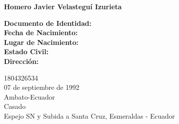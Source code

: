 
\centering\Large\textbf{Homero Javier Velasteguí Izurieta}\\[50pt]

\setlength{\columnsep}{0.75cm}
\setlength{\columnseprule}{0pt}



\begin{paracol}{2}
\begin{leftcolumn}


\begin{minipage}[c][40mm][c]{0.47\textwidth}

\textbf{Documento de Identidad:\\[15pt]
Fecha de Nacimiento:\\[15pt]
Lugar de Nacimiento:\\[15pt]
Estado Civil:\\[15pt]
Dirección:\\}

\end{minipage}




\end{leftcolumn}

\begin{rightcolumn}
\begin{minipage}[c][40mm][c]{0.47\textwidth}
1804326534\\[15pt]
07 de septiembre de 1992\\[15pt]
Ambato-Ecuador\\[15pt]
Casado\\[15pt]
Espejo SN y Subida a Santa Cruz, Esmeraldas - Ecuador
\end{minipage}

\end{rightcolumn}

\end{paracol}